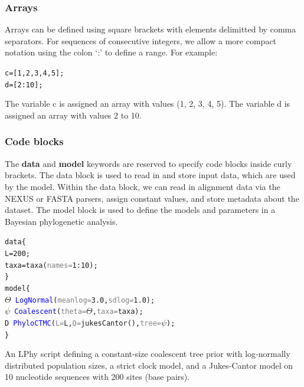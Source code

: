 \documentclass[10pt,letterpaper,table]{article}
\theoremstyle{definition}
\newtheorem{exmp}{Example}[]
\begin{document}
\subsubsection{Arrays}
Arrays can be defined using square brackets with elements delimitted by comma separators. 
For sequences of consecutive integers, we allow a more compact notation using the colon `:’ to define a range.
For example:  
{
  \small
  \begin{listing}
    \begin{alltt}
    c =[\textcolor{constant}{1}, \textcolor{constant}{2}, \textcolor{constant}{3}, \textcolor{constant}{4}, \textcolor{constant}{5}];
    d =[\textcolor{constant}{2}:\textcolor{constant}{10}];
    \end{alltt}
  \end{listing}
}
\noindent The variable c is assigned an array with values (1, 2, 3, 4, 5). 
The variable d is assigned an array with values 2 to 10.

\subsubsection{Code blocks}
The \textbf{data} and \textbf{model} keywords are reserved to specify code blocks inside curly brackets. 
The data block is used to read in and store input data, which are used by the model. 
Within the data block, we can read in alignment data via the NEXUS or FASTA parsers, assign constant values, and store metadata about the dataset.
The model block is used to define the models and parameters in a Bayesian phylogenetic analysis. 
\begin{example}
{
  \small
    \begin{alltt}
  data \{
    L = \textcolor{constant}{200};
    taxa = \textcolor{generator}{taxa}(\textcolor{gray}{names=}\textcolor{constant}{1}:\textcolor{constant}{10});
  \}
  model \{
    \textcolor{bluishgreen}{\(\Theta\)} ~ \textcolor{blue}{LogNormal}(\textcolor{gray}{meanlog=}\textcolor{constant}{3.0}, \textcolor{gray}{sdlog=}\textcolor{constant}{1.0});
    \textcolor{bluishgreen}{\(\psi\)} ~ \textcolor{blue}{Coalescent}(\textcolor{gray}{theta=}\textcolor{bluishgreen}{\(\Theta\)}, \textcolor{gray}{taxa=}taxa);
    \textcolor{bluishgreen}{D} ~ \textcolor{blue}{PhyloCTMC}(\textcolor{gray}{L=}L, \textcolor{gray}{Q=}\textcolor{generator}{jukesCantor}(), \textcolor{gray}{tree=}\textcolor{bluishgreen}{\(\psi\)});
  \}
    \end{alltt}
    \caption{\small{An LPhy script defining a constant-size coalescent tree prior with log-normally distributed population sizes, a strict clock model, and a Jukes-Cantor model on 10 nucleotide sequences with 200 sites (base pairs).}}
    \label{lphy:jccoal}
}
\end{example}
\end{document}
